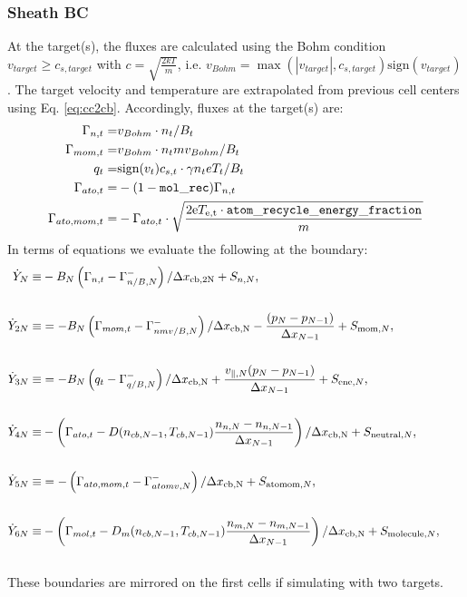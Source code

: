 \documentclass[amsmath,amssymb,a4]{revtex4-2}
\begin{document}
\subsubsection{Sheath BC}
At the target(s), the fluxes are calculated using the Bohm condition $v_{target} \geq c_{s,target}$ with $c = \sqrt{\frac{2kT}{m}}$, i.e. $v_{Bohm}=\max(|v_{target}|, c_{s,target}) \text{sign}(v_{target})$. The target velocity and temperature are extrapolated from previous cell centers using Eq. \ref{eq:cc2cb}. 
Accordingly, fluxes at the target(s) are:
\begin{eqnarray}
    \Gamma_{n,t} =& v_{Bohm}\cdot n_{t}/B_{t} \\
    \Gamma_{mom,t} =& v_{Bohm}\cdot n_{t}m v_{Bohm} / B_{t} \\
    q_{t} =& \text{sign}(v_{t})c_{s,t}\cdot \gamma n_{t} e T_{t} / B_{t} \\
      \Gamma_{ato,t} =& -(1-{\tt mol\_rec}) \Gamma_{n,t}\\
    \Gamma_{ato,mom,t} =& - \Gamma_{ato,t} \cdot \sqrt{\frac{2 \mathrm{e}T_{\rm e,t} \cdot {\tt atom\_recycle\_energy\_fraction} }{m}} 
\end{eqnarray}
In terms of equations we evaluate the following at the boundary:
\begin{eqnarray}
    \dot{Y}_{N} \equiv& - B_N \left( \Gamma_{n,t} -\Gamma_{n/B,N}^- \right)/ \Delta x_{\rm cb,2N} + S_{n,N}, & \nonumber \\ \nonumber \\
    \dot{Y}_{2N} \equiv&  = -  B_N \left( \Gamma_{mom,t} -\Gamma_{nmv/B,N}^- \right)/\Delta x_{\rm cb,N} - \frac{(p_N-p_{N-1})}{\Delta x_{N-1}} + S_{{\rm mom},N},& \nonumber \\ \nonumber \\
    \dot{Y}_{3N} \equiv& = -  B_N \left( q_t -\Gamma_{q/B,N}^- \right)/\Delta x_{\rm cb,N} + \frac{v_{\|,N}(p_N-p_{N-1})}{\Delta x_{N-1}} + S_{{\rm ene},N},& \nonumber \\ \nonumber \\
     \dot{Y}_{4N} \equiv& -\left( \Gamma_{ato,t} - D(n_{cb,N-1},T_{cb,N-1})\frac{n_{n,N}-n_{n,N-1}}{\Delta x_{N-1}} \right)/\Delta x_{\rm cb,N} + S_{{\rm neutral},N},&\quad \nonumber \\ \nonumber \\
      \dot{Y}_{5N} \equiv&  = - \left( \Gamma_{ato,mom,t} -\Gamma_{atomv,N}^- \right)/\Delta x_{\rm cb,N}  + S_{{\rm ato mom},N},& \nonumber \\ \nonumber \\
      \dot{Y}_{6N} \equiv& -\left( \Gamma_{mol,t} - D_m(n_{cb,N-1},T_{cb,N-1})\frac{n_{m,N}-n_{m,N-1}}{\Delta x_{N-1}} \right)/\Delta x_{\rm cb,N} + S_{{\rm molecule},N},&\quad \nonumber \\ \nonumber \\
\end{eqnarray}
These boundaries are mirrored on the first cells if simulating with two targets.
\end{document}
